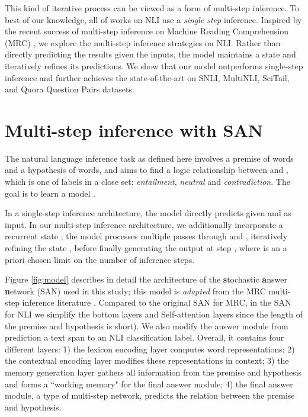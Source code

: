 \documentclass[11pt,a4paper]{article}
\newcommand\MIN{SAN}
\begin{document}
This kind of iterative process can be viewed as a form of multi-step inference. To best of our knowledge, all of works on NLI use a \textit{single step} inference. Inspired by the recent success of multi-step inference on Machine Reading Comprehension (MRC) \cite{hill2015goldilocks,dhingra2016gated,sordoni2016iterative,kumar15askme, liu18san, shen2017empirical,xu2018multi}, we explore the multi-step inference strategies on NLI.
Rather than directly predicting the results given the inputs, the model maintains a state and iteratively refines its predictions.
We show that our model outperforms single-step inference and further achieves the state-of-the-art on SNLI, MultiNLI, SciTail, and Quora Question Pairs datasets. \section{Multi-step inference with SAN}
\label{sec:model}
\vspace{-0.1cm}
The natural language inference task as defined here involves a premise  of  words and a hypothesis  of  words,
and aims to find a logic relationship  between  and , which is one of labels in a close set: \textit{entailment}, \textit{neutral} and \textit{contradiction}. 
The goal is to learn a model . 


In a single-step inference architecture, the model directly predicts  given  and  as input. 
In our multi-step inference architecture, we additionally incorporate a recurrent state ; the model processes multiple passes through  and , iteratively refining the state , before finally generating the output at step , where  is an a priori chosen limit on the number of inference steps. 


\begin{figure*}[h!]
\centering
{}
\caption{\label{fig:model} {Architecture of the Stochastic Answer Network ({\MIN}) for Natural Language Inference.}}
\end{figure*}

Figure \ref{fig:model} describes in detail the architecture of the \textbf{s}tochastic \textbf{a}nswer \textbf{n}etwork (SAN) used in this study; this model is \textit{adapted} from the MRC multi-step inference literature \cite{liu18san}. Compared to the original SAN for MRC, in the SAN for NLI we simplify the bottom layers and Self-attention layers since the length of the premise and hypothesis is short). We also modify the answer module from prediction a text span to an NLI classification label.  
Overall, it contains four different layers:
1) the lexicon encoding layer computes word representations; 
2) the contextual encoding layer modifies these representations in context; 
3) the memory generation layer gathers all information from the premise and hypothesis and forms a ``working memory" for the final answer module; 
4) the final answer module, a type of multi-step network, predicts the relation between the premise and hypothesis. 
\end{document}
